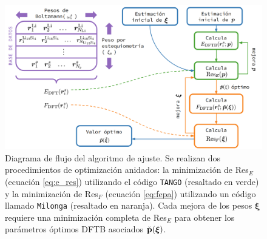 \begin{figure}[h!]
    \centering
    \includegraphics[width=\textwidth]{Silicio/modelo/metodos/diagrama.png}
    \caption{Diagrama de flujo del algoritmo de ajuste. Se realizan dos
    procedimientos de optimización anidados: la minimización de Res$_E$ (ecuación 
    \ref{eq:e_res}) utilizando el código \texttt{TANGO} \cite{tango} (resaltado en
    verde) y la minimización de Res$_F$ (ecuación \ref{eq:fepa}) utilizando un 
    código llamado \texttt{Milonga} (resaltado en naranja). Cada mejora de los pesos
    $\boldsymbol{\xi}$ requiere una minimización completa de Res$_E$ para obtener 
    los parámetros óptimos DFTB asociados $\check{{\bf p}}(\boldsymbol{\xi})$.}
    \label{fig:diagrama}
\end{figure}
